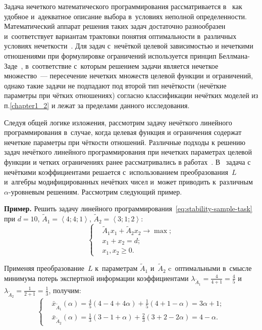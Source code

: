 Задача нечеткого математического программирования рассматривается в~\cite{Matveev_Fuzzy_LP, Matveev_PIIT_2011, Melkumova_Vestnik, Zak, Liu_Fuzzy_Programming} как удобное и~адекватное описание выбора в~условиях неполной определенности. Математический аппарат решения таких задач достаточно разнообразен~\cite{Melkumova_Vestnik, Liu_Fuzzy_Programming} и~соответствует вариантам трактовки понятия оптимальности в~различных условиях нечеткости~\cite{Matveev_Starodubtsev}. Для задач с~нечёткой целевой зависимостью и нечеткими отношениями при формулировке ограничений используется принцип Беллмана-Заде~\cite{Bellman_Zadeh, Ukhobotov_Chosen}, в~соответствие с~которым решением задачи является нечеткое множество~--- пересечение нечетких множеств целевой функции и ограничений, однако такие задачи не подпадают под второй тип нечёткости (нечёткие параметры при чётких отношениях) согласно классификации нечётких моделей из п.\ref{chapter1_2} и лежат за пределами данного исследования.

Следуя общей логике изложения, рассмотрим задачу нечёткого линейного программирования в~случае, когда целевая функция и ограничения содержат нечеткие параметры при чёткости отношений. Различные подходы к решению задач нечёткого линейного программирования при нечетких параметрах целевой функции и четких ограничениях ранее рассматривались в работах~\cite{Orlovskiy, Zak, Matveev_PIIT_2011, Matveev_Fuzzy_LP}. В~\cite{Vorontsov_PI} задача с нечёткими коэффициентами решается с~использованием преобразования~$L$ и~алгебры модифицированных нечётких чисел и~может приводить к~различным~$\alpha$-уровневым решениям. Рассмотрим следующий пример.

\textbf{Пример.} Решить задачу линейного программирования~\eqref{eq:stability-sample-task} при $d=10$, $\tilde A_1 = \left \langle 4; 4; 1 \right \rangle$, $\tilde A_2 = \left \langle 3; 1; 2\right \rangle$:
\begin{equation}
\label{eq:stability-sample-task}
  \left\{ \begin{aligned}
    & \tilde A_1 x_1 + \tilde A_2 x_2 \to \max; \\
    & x_1 + x_2 = d; \\
    & x_1, x_2 \geqslant 0.
  \end{aligned} \right.
\end{equation}

Применяя преобразование~$L$ к~параметрам $\tilde A_1$ и~$\tilde A_2$ c~оптимальными в~смысле минимума потерь экспертной информации коэффициентами $\displaystyle \lambda_{\tilde A_1}=\frac{4}{4+1}=\frac{4}{5}$ и $\displaystyle \lambda_{\tilde A_2}=\frac{1}{2+1}=\frac{1}{3}$, получим:
\begin{equation}
\label{eq:stability-sample-modified}
  \left\{ \begin{aligned}
    & \bar{x}_{\tilde A_1}\left(\alpha \right)=\frac{4}{5}\left(4-4+4\alpha \right)+\frac{1}{5}\left(4+1-\alpha \right)=3\alpha+1; \\
    & \bar{x}_{\tilde A_2}\left(\alpha \right)=\frac{1}{3}\left(3-1+\alpha \right)+\frac{2}{3}\left(3+2-2\alpha \right)=4-\alpha.
  \end{aligned} \right.
\end{equation}

